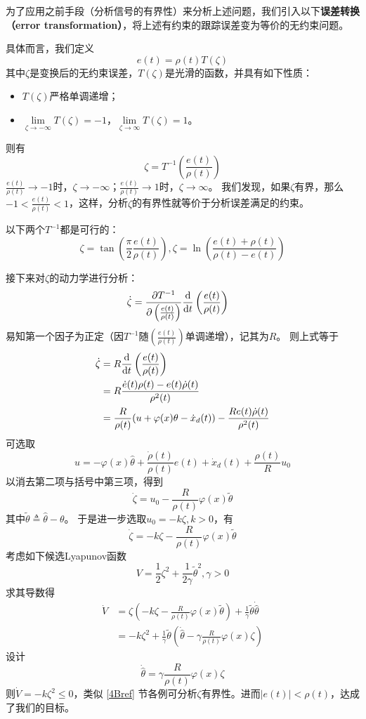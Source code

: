 为了应用之前手段（分析信号的有界性）来分析上述问题，我们引入以下{\bf 误差转换（error transformation）}，将上述有约束的跟踪误差变为等价的无约束问题。

具体而言，我们定义\[e(t)=\rho(t)T(\zeta)\]
其中$\zeta$是变换后的无约束误差，$T(\zeta)$是光滑的函数，并具有如下性质：
\begin{itemize}[leftmargin=1em]
    \item $T(\zeta)$严格单调递增；
    \item $\lim\limits_{\zeta\to-\infty}T(\zeta)=-1$，$\lim\limits_{\zeta\to\infty}T(\zeta)=1$。
\end{itemize}
则有
\[\zeta = T^{-1}\left(\frac{e(t)}{\rho(t)}\right)\]
$\frac{e(t)}{\rho(t)}\to -1$时，$\zeta\to-\infty$；$\frac{e(t)}{\rho(t)}\to 1$时，$\zeta\to\infty$。
我们发现，如果$\zeta$有界，那么$-1<\frac{e(t)}{\rho(t)}<1$，这样，分析$\zeta$的有界性就等价于分析误差满足的约束。

\begin{example}
    以下两个$T^{-1}$都是可行的：
    \[\zeta = \tan\left(\frac{\pi}{2}\frac{e(t)}{\rho(t)}\right),\zeta = \ln\left(\frac{e(t)+\rho(t)}{\rho(t)-e(t)}\right)\]
\end{example}

接下来对$\zeta$的动力学进行分析：
\begin{align*}
    \dot{\zeta} &= \frac{\partial T^{-1}}{\partial \left(\frac{e(t)}{\rho(t)}\right)}
    \frac{\mathop{}\!\mathrm{d}}{\mathop{}\!\mathrm{d} t}\left(\frac{e(t)}{\rho(t)}\right)
\end{align*}
易知第一个因子为正定（因$T^{-1}$随$\left(\frac{e(t)}{\rho(t)}\right)$单调递增），记其为$R$。
则上式等于
\begin{align*}
    \dot{\zeta} &= R
    \frac{\mathop{}\!\mathrm{d}}{\mathop{}\!\mathrm{d} t}\left(\frac{e(t)}{\rho(t)}\right)\\
    &=R\frac{\dot{e}(t)\rho(t)-e(t)\dot{\rho}(t)}{\rho^2(t)}\\
    &=\frac{R}{\rho(t)}(u+\varphi(x)\theta-\dot{x}_d(t))-\frac{Re(t)\dot{\rho}(t)}{\rho^2(t)}
\end{align*}
可选取\[u=-\varphi(x)\hat{\theta}+\frac{\dot{\rho}(t)}{\rho(t)}e(t)+\dot{x}_d(t)+\frac{\rho(t)}{R}u_0\]
以消去第二项与括号中第三项，得到
\[\dot{\zeta} = u_0-\frac{R}{\rho(t)}\varphi(x)\tilde{\theta}\]
其中$\tilde{\theta}\triangleq \hat{\theta}-\theta$。
于是进一步选取$u_0=-k\zeta,k>0$，有
\[\dot{\zeta} = -k\zeta-\frac{R}{\rho(t)}\varphi(x)\tilde{\theta}\]
考虑如下候选Lyapunov函数
\[V=\frac{1}{2}\zeta^2+\frac{1}{2\gamma}\tilde{\theta}^2,\gamma>0\]
求其导数得\begin{align*}
    \dot{V}&=\zeta\left(-k\zeta-\frac{R}{\rho(t)}\varphi(x)\tilde{\theta}\right)+\frac{1}{\gamma}\tilde{\theta}\dot{\hat{\theta}}\\
    &=-k\zeta^2+\frac{1}{\gamma}\tilde{\theta}\left(\dot{\hat{\theta}}-\gamma \frac{R}{\rho(t)}\varphi(x)\zeta\right)
\end{align*}
设计\[\dot{\hat{\theta}}=\gamma \frac{R}{\rho(t)}\varphi(x)\zeta\]
则$\dot{V}=-k\zeta^2\le 0$，类似 \ref{4Bref} 节各例可分析$\zeta$有界性。进而$|e(t)|<\rho(t)$，达成了我们的目标。

